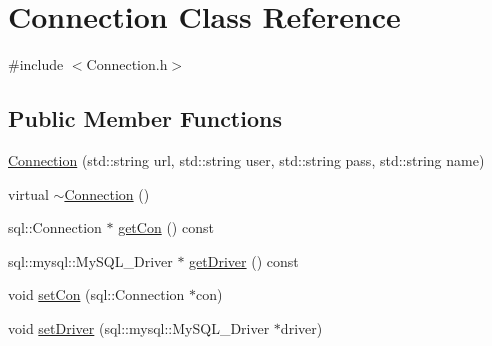\hypertarget{class_connection}{
\section{Connection Class Reference}
\label{class_connection}
}


{\ttfamily \#include $<$Connection.h$>$}

\subsection*{Public Member Functions}
\begin{DoxyCompactItemize}
\item 
\hyperlink{class_connection_a6970de2fa9268fe6f96179f62896ebb1}{Connection} (std::string url, std::string user, std::string pass, std::string name)
\item 
virtual \hyperlink{class_connection_a2e4352edf667bea83001569e9da8a24d}{$\sim$Connection} ()
\item 
sql::Connection $\ast$ \hyperlink{class_connection_a1a452e7d0205cbf773855fe7721a52dd}{getCon} () const 
\item 
sql::mysql::MySQL\_\-Driver $\ast$ \hyperlink{class_connection_aab4ca656dabf965911a04e1df739b2d5}{getDriver} () const 
\item 
void \hyperlink{class_connection_a83036b70adab4586a8daba905b4e3cd6}{setCon} (sql::Connection $\ast$con)
\item 
void \hyperlink{class_connection_af98d381ac53362ffa8661c40d0ab3b13}{setDriver} (sql::mysql::MySQL\_\-Driver $\ast$driver)
\end{DoxyCompactItemize}


